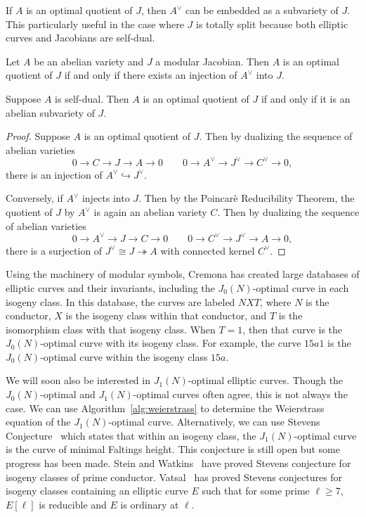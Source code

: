 \documentclass[11pt, proquest]{uwthesis}
\begin{document}
If $A$ is an optimal quotient of $J$, then $A^\vee$ can be embedded as a
subvariety of $J$. This particularly useful in the case where $J$ is totally
split because both elliptic curves and Jacobians are self-dual.

\begin{proposition}
    \label{prop:optimal}
    Let $A$ be an abelian variety and $J$ a modular Jacobian. Then $A$ is an
    optimal quotient of $J$ if and only if there exists an injection of
    $A^\vee$ into $J$.

    Suppose $A$ is self-dual. Then
    $A$ is an optimal quotient of $J$ if and only if it is an abelian
    subvariety of $J$.
\end{proposition}
\begin{proof}
    Suppose $A$ is an optimal quotient of $J$. Then by dualizing the sequence
    of abelian varieties~\cite[Proposition 2.4.2]{lange-birkenhake:complex}
    \[
        0 \to C \to J \to A \to 0 \qquad
        0\to A^\vee \to J^\vee \to C^\vee \to 0,
    \]
    there is an injection of $A^\vee\hookrightarrow J^\vee$.

    Conversely, if $A^\vee$ injects into $J$. Then by the Poincar\`{e} Reducibility
    Theorem, the quotient of $J$ by $A^\vee$ is again an abelian variety $C$.
    Then by dualizing the sequence of abelian varieties
    \[
        0 \to A^\vee \to J \to C \to 0 \qquad
        0 \to C^\vee \to J^\vee \to A \to 0,
    \]
    there is a surjection of $J^\vee\cong J\twoheadrightarrow A$ with connected
    kernel $C^\vee$.
\end{proof}

Using the machinery of modular symbols, Cremona has created large databases of
elliptic curves and their invariants, including the $J_0(N)$-optimal curve in
each isogeny class. In this database, the curves are labeled $NXT$, where $N$
is the conductor, $X$ is the isogeny class within that conductor, and $T$ is
the isomorphism class with that isogeny class. When $T=1$, then that curve is
the $J_0(N)$-optimal curve with its isogeny class. For example, the curve
$15a1$ is the $J_0(N)$-optimal curve within the isogeny class $15a$.

We will soon also be interested in $J_1(N)$-optimal elliptic curves. Though the
$J_0(N)$-optimal and $J_1(N)$-optimal curves often agree, this is not always
the case. We can use Algorithm~\ref{alg:weierstrass} to determine the
Weierstrass equation of the $J_1(N)$-optimal curve. Alternatively, we can use
Stevens Conjecture~\cite[Conjecture II]{stevens:param} which states that within
an isogeny class, the $J_1(N)$-optimal curve is the curve of minimal Faltings
height. This conjecture is still open but some progress has been made. Stein
and Watkins~\cite[\S 3]{stein-watkins:ns} have proved Stevens conjecture for
isogeny classes of prime conductor. Vatsal~\cite[Thm.
1.11]{vatsal:multiplicative} has proved Stevens conjectures for isogeny classes
containing an elliptic curve $E$ such that for some prime $\ell\geq 7$,
$E[\ell]$ is reducible and $E$ is ordinary at $\ell$.
\end{document}
